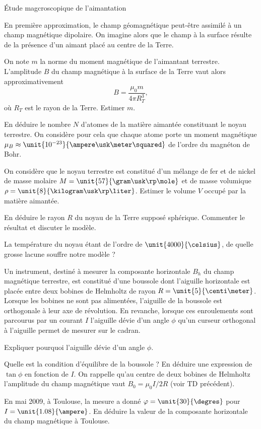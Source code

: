 \begin{td}{Étude magcroscopique de l'aimantation}

	En première approximation, le champ géomagnétique peut-être assimilé
	à un champ magnétique dipolaire. On imagine alors que le champ à la surface
	résulte de la présence d'un aimant placé au centre de la Terre.
	\begin{exlist}
		\item On note $m$ la norme du moment magnétique de l'aimantant terrestre. 
		L'amplitude $B$ du champ magnétique à la surface de la Terre 
		vaut alors approximativement
		\begin{equation*}
			B = \dfrac{\mu_0 m}{4 \pi R_T^3},
		\end{equation*}
		où $R_T$ est le rayon de la Terre. Estimer $m$.
	\item En déduire le nombre $N$ d'atomes de la matière aimantée constituant le noyau
	  terrestre. On considère pour cela que chaque atome porte un moment
	  magnétique $\mu_B \approx \unit{10^{-23}}{\ampere \usk \meter \squared}$ 
	  de l'ordre du magnéton de Bohr.
	\item On considère que le noyau terrestre est constitué d'un mélange de fer
	  et de nickel de masse molaire $M = \unit{57}{\gram \usk \rp \mole}$
	  et de masse volumique $\rho = \unit{8}{\kilogram \usk \rp \liter}$.
	  Estimer le volume $V$ occupé par la matière aimantée.
	\item En déduire le rayon $R$ du noyau de la Terre supposé sphérique.
	  Commenter le résultat et discuter le modèle. 
	\item La température du noyau étant de l'ordre de $\unit{4000}{\celsius}$,
	  de quelle grosse lacune souffre notre modèle ?
	  
	\end{exlist}


	Un instrument, destiné à mesurer la composante horizontale $B_h$
	du champ magnétique
	terrestre, est constitué d'une boussole dont l'aiguille horizontale est 
	placée entre deux bobines de Helmholtz de rayon $R = \unit{5}{\centi \meter}$. 
	Lorsque les bobines ne sont pas alimentées, l'aiguille de la boussole 
	est orthogonale à leur axe de révolution.
	En revanche, lorsque ces enroulements
	sont parcourus par un courant $I$ l'aiguille dévie d'un angle $\phi$
	qu'un curseur orthogonal à l'aiguille permet de mesurer sur le cadran.
	\begin{exlist}
	  \item Expliquer pourquoi l'aiguille dévie d'un angle $\phi$.
    	  \item Quelle est la condition d'équilibre de la boussole ? 
	    En déduire une expression de $\tan \phi$ en fonction de $I$.
	    On rappelle qu'au centre de deux bobines de Helmholtz l'amplitude du champ 
	    magnétique vaut $B_0 = \mu_0 I/2R$ (voir TD précédent).
	  \item En mai 2009, à Toulouse, la mesure a donné $\phi = \unit{30}{\degres}$
	    pour $I = \unit{1.08}{\ampere}$. En déduire la valeur de
	    la composante horizontale du champ magnétique à Toulouse. 
	\end{exlist}



\end{td}
